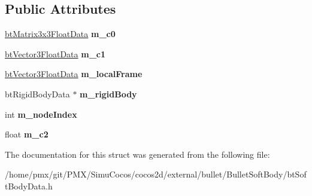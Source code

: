 \subsection*{Public Attributes}
\begin{DoxyCompactItemize}
\item 
\mbox{\label{structSoftRigidAnchorData_a0a22d1db38d705aeed26b269ea626fd4}} 
\hyperlink{structbtMatrix3x3FloatData}{bt\+Matrix3x3\+Float\+Data} {\bfseries m\+\_\+c0}
\item 
\mbox{\label{structSoftRigidAnchorData_a83c966bd2a61bb9b6324bc66ba6425aa}} 
\hyperlink{structbtVector3FloatData}{bt\+Vector3\+Float\+Data} {\bfseries m\+\_\+c1}
\item 
\mbox{\label{structSoftRigidAnchorData_a1c9b5b7de7eae0bcefcc06241ea10b04}} 
\hyperlink{structbtVector3FloatData}{bt\+Vector3\+Float\+Data} {\bfseries m\+\_\+local\+Frame}
\item 
\mbox{\label{structSoftRigidAnchorData_a893c8e4bd76a06d9312439d615ca9676}} 
bt\+Rigid\+Body\+Data $\ast$ {\bfseries m\+\_\+rigid\+Body}
\item 
\mbox{\label{structSoftRigidAnchorData_aff037297a50a284782d25b7b9e07128e}} 
int {\bfseries m\+\_\+node\+Index}
\item 
\mbox{\label{structSoftRigidAnchorData_ac04b4388734aef9e6aca362fc6a686e2}} 
float {\bfseries m\+\_\+c2}
\end{DoxyCompactItemize}


The documentation for this struct was generated from the following file\+:\begin{DoxyCompactItemize}
\item 
/home/pmx/git/\+P\+M\+X/\+Simu\+Cocos/cocos2d/external/bullet/\+Bullet\+Soft\+Body/bt\+Soft\+Body\+Data.\+h\end{DoxyCompactItemize}
